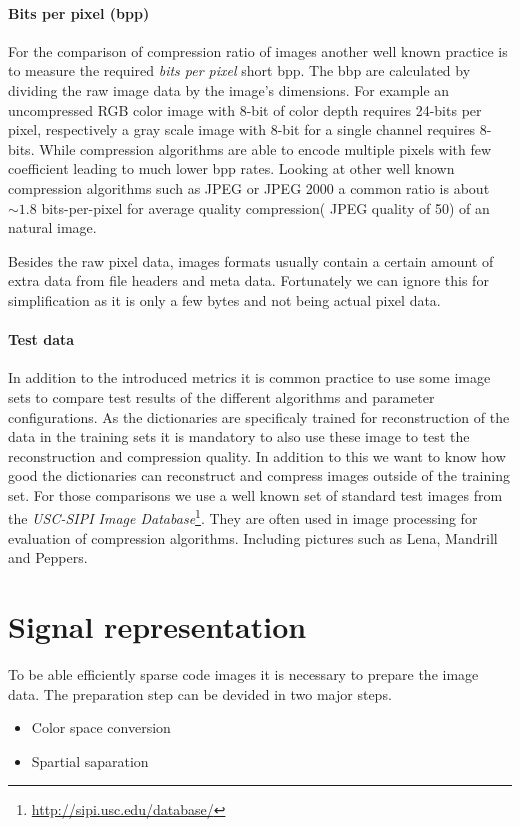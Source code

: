 \paragraph{Bits per pixel (bpp)} 
For the comparison of compression ratio of images another well known practice is
to measure the required \emph{bits per pixel} short bpp. The bbp are calculated
by dividing the raw image data by the image's dimensions. For example an
uncompressed RGB color image with 8-bit of color depth requires 24-bits per
pixel, respectively a gray scale image with 8-bit for a single channel requires
8-bits. While compression algorithms are able to encode multiple pixels with few
coefficient leading to much lower bpp rates.
Looking at other well known compression algorithms such as JPEG or
JPEG 2000 a common ratio is about $\sim1.8$ bits-per-pixel for average
quality compression( JPEG quality of 50) of an natural image. 

Besides the raw pixel data, images formats usually contain a certain amount
of extra data from file headers and meta data. Fortunately we can ignore this
for simplification as it is only a few bytes and not being actual pixel data.

\paragraph{Test data}
In addition to the introduced metrics it is common practice to use some image
sets to compare test results of the different algorithms and parameter
configurations. As the dictionaries are specificaly trained for
reconstruction of the data in the training sets it is mandatory to also use
these image to test the reconstruction and compression quality.
In addition to this we want to know how good the dictionaries can reconstruct
and compress images outside of the training set. For those comparisons we use a
well known set of standard test images from the \emph{USC-SIPI Image
Database}\footnote{\url{http://sipi.usc.edu/database/}}. They are often
used in image processing for evaluation of compression algorithms. 
Including pictures such as Lena, Mandrill and Peppers.



\section{Signal representation}
\label{sec:signal_representation}
To be able efficiently sparse code images it is necessary to prepare the
image data. The preparation step can be devided in two major steps.
\begin{itemize}
 \item Color space conversion
 \item Spartial saparation
\end{itemize}


